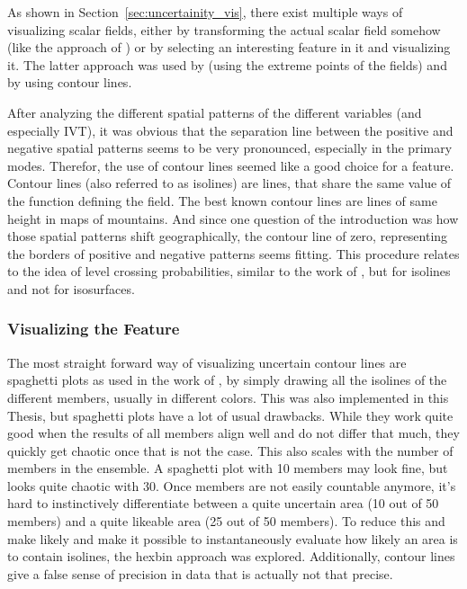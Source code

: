 As shown in Section~\ref{sec:uncertainity_vis}, there exist multiple ways of visualizing scalar fields, either by transforming the actual scalar field somehow (like the approach of ) or by selecting an interesting feature in it and visualizing it. 
The latter approach was used by   (using the extreme points of the fields) and by \cite{sanyal_noodles_2010, whitaker_contour_2013} using contour lines.  

After analyzing the different spatial patterns of the different variables (and especially IVT), it was obvious that the separation line between the positive and negative spatial patterns seems to be very pronounced, especially in the primary modes. 
Therefor, the use of contour lines seemed like a good choice for a feature. 
Contour lines (also referred to as isolines) are lines, that share the same value of the function defining the field. The best known contour lines are lines of same height in maps of mountains.  
And since one question of the introduction was how those spatial patterns shift geographically, the contour line of zero, representing the borders of positive and negative patterns seems fitting. 
This procedure relates to the idea of level crossing probabilities, similar to the work of , but for isolines and not for isosurfaces.

\subsubsection{Visualizing the Feature}

The most straight forward way of visualizing uncertain  contour lines are spaghetti plots as used in the work of , by simply drawing all the isolines of the different members, usually in different colors. 
This was also implemented in this Thesis, but spaghetti plots have a lot of usual drawbacks. 
While they work quite good when the results of all members align well and do not differ that much, they quickly get chaotic once that is not the case. 
This also scales with the number of members in the ensemble. 
A spaghetti plot with 10 members may look fine, but looks quite chaotic with 30. 
Once members are not easily countable anymore, it's hard to instinctively differentiate between a quite uncertain area (10 out of 50 members) and a quite likeable area (25 out of 50 members). 
To reduce this and make likely and make it possible to instantaneously evaluate how likely an area is to contain isolines, the hexbin approach was explored.
Additionally, contour lines give a false sense of precision in data that is actually not that precise. 


